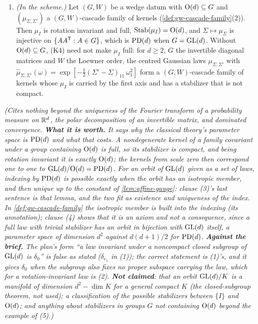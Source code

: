 \begin{lemma}
\begin{enumerate}
$\operatorname{Orb}(\mu_0)$, and no member of $\operatorname{Orb}(\mu_0)$ is rotation invariant.
\item \emph{(In the scheme.)} Let $(G, W)$ be a wedge datum with $\mathrm{O}(d) \subseteq G$ and
$(\mu_{\Sigma,\Sigma'})$ a $(G, W)$-cascade family of kernels (\ref{def:gw-cascade-family}(2)). Then
$\mu_I$ is rotation invariant and full, $\operatorname{Stab}(\mu_I) = \mathrm{O}(d)$, and
$\Sigma \mapsto \mu_\Sigma$ is injective on $\{AA^{\mathsf{T}} : A \in G\}$, which is $\mathrm{PD}(d)$ when
$G = \mathrm{GL}(d)$. Without $\mathrm{O}(d) \subseteq G$, (K4) need not make $\mu_I$ full: for $d \ge 2$, $G$
the invertible diagonal matrices and $W$ the Loewner order, the centred Gaussian laws
$\mu_{\Sigma,\Sigma'}$ with $\widehat\mu_{\Sigma,\Sigma'}(\omega) =
\exp[-\tfrac12(\Sigma' - \Sigma)_{11}\,\omega_1^2]$ form a $(G, W)$-cascade family of kernels whose
$\mu_I$ is carried by the first axis and has a stabilizer that is not compact.
\end{enumerate}
\statusT\quad\emph{(Cites nothing beyond the uniqueness of the Fourier transform of a probability
measure on $\mathbb{R}^d$, the polar decomposition of an invertible matrix, and dominated convergence.
\textbf{What it is worth.} It says why the classical theory's parameter space is $\mathrm{PD}(d)$ and what
that costs. A nondegenerate kernel of a family covariant under a group containing $\mathrm{O}(d)$ is
full, so its stabilizer is compact, and being rotation invariant it is exactly $\mathrm{O}(d)$; the
kernels from scale zero then correspond one to one to $\mathrm{GL}(d)/\mathrm{O}(d) = \mathrm{PD}(d)$. For an orbit of
$\mathrm{GL}(d)$ given as a set of laws, indexing by $\mathrm{PD}(d)$ is possible exactly when the orbit has an
isotropic member, and then unique up to the constant of \ref{lem:affine-gauge}: clause (3)'s last
sentence is that lemma, and the two fit as existence and uniqueness of the index. In
\ref{def:gw-cascade-family} the isotropic member is built into the indexing (its annotation); clause
(4) shows that it is an axiom and not a consequence, since a full law with trivial stabilizer has an
orbit in bijection with $\mathrm{GL}(d)$ itself, a parameter space of dimension $d^2$ against
$d(d+1)/2$ for $\mathrm{PD}(d)$. \textbf{Against the brief.} The plan's form ``a law invariant under a
noncompact closed subgroup of $\mathrm{GL}(d)$ is $\delta_0$'' is false as stated ($\delta_{e_1}$ in (1)); the
correct statement is (1)'s, and it gives $\delta_0$ when the subgroup also fixes no proper subspace
carrying the law, which for a rotation-invariant law is (2). \textbf{Not claimed}: that an orbit
$\mathrm{GL}(d)/K$ is a manifold of dimension $d^2 - \dim K$ for a general compact $K$ (the closed-subgroup
theorem, not used); a classification of the possible stabilizers between $\{I\}$ and $\mathrm{O}(d)$; and
anything about stabilizers in groups $G$ not containing $\mathrm{O}(d)$ beyond the example of (5).)}
\end{lemma}

